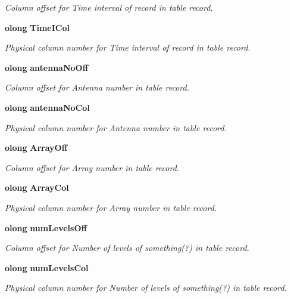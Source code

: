 \begin{CompactItemize}
\begin{CompactList}\small\item\em Column offset for Time interval of record in table record. \item\end{CompactList}\item 
{\bf olong} {\bf Time\-ICol}
\begin{CompactList}\small\item\em Physical column number for Time interval of record in table record. \item\end{CompactList}\item 
{\bf olong} {\bf antenna\-No\-Off}
\begin{CompactList}\small\item\em Column offset for Antenna number in table record. \item\end{CompactList}\item 
{\bf olong} {\bf antenna\-No\-Col}
\begin{CompactList}\small\item\em Physical column number for Antenna number in table record. \item\end{CompactList}\item 
{\bf olong} {\bf Array\-Off}
\begin{CompactList}\small\item\em Column offset for Array number in table record. \item\end{CompactList}\item 
{\bf olong} {\bf Array\-Col}
\begin{CompactList}\small\item\em Physical column number for Array number in table record. \item\end{CompactList}\item 
{\bf olong} {\bf num\-Levels\-Off}
\begin{CompactList}\small\item\em Column offset for Number of levels of something(?) in table record. \item\end{CompactList}\item 
{\bf olong} {\bf num\-Levels\-Col}
\begin{CompactList}\small\item\em Physical column number for Number of levels of something(?) in table record. \item\end{CompactList}\item 

\end{CompactItemize}
